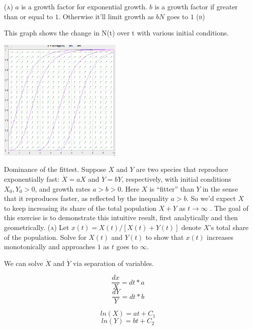 \documentclass[11pt,answers]{exam}
\begin{document}
\begin{questions}
\begin{solution}
\newline\textsc{(a)} $a$ is a growth factor for exponential growth.  $b$ is a growth factor if greater than or equal to $1$.  Otherwise it'll limit growth as $bN$ goes to $1$
\newline\newline\textsc{(b)}

This graph shows the change in N(t) over t with various initial conditions. 

\begin{center}\includegraphics[width = 0.45\textwidth]{sketch}\end{center}
\end{solution}

\item Dominance of the fittest.  Suppose $X$ and $Y$ are two species that reproduce exponentially fast: $\dot{X} = aX$ and $\dot{Y} = bY$, respectively, with initial conditions $X_0, Y_0 > 0$, and growth rates $a > b > 0$. Here $X$ is “fitter” than $Y$ in the sense that it reproduces faster, as reflected by the inequality $a > b$. So we’d expect $X$ to keep increasing its share of the total population $X + Y$ as $t \to \infty$ . The goal of this exercise is to demonstrate this intuitive result, first analytically and then geometrically.
\newline\textsc{(a)} Let $x(t) = X(t)/[X(t) + Y(t)]$ denote $X$'s total share of the population.  Solve for $X(t)$ and $Y(t)$ to show that $x(t)$ increases monotonically and approaches $1$ as $t$ goes to $\infty$.

\begin{solution}

We can solve $\dot{X}$ and $\dot{Y}$ via separation of variables.

$$\frac{dx}{X} = dt*a$$ $$\frac{dY}{Y} = dt*b$$

$$ln(X) = at + C_1$$ $$ln(Y) = bt + C_2$$


\end{solution}
\end{questions}
\end{document}
